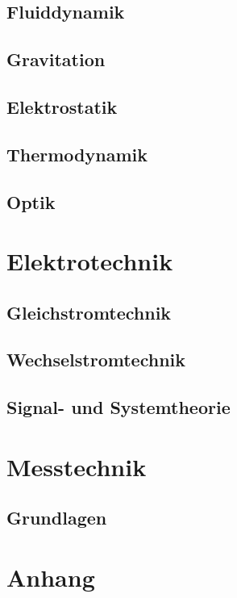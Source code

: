 \documentclass[a5paper]{report}
\begin{document}
		\chapter{Fluiddynamik}
		

		\chapter{Gravitation}
		

		\chapter{Elektrostatik}
		

		\chapter{Thermodynamik}
		

		\chapter{Optik}
		

	\part{Elektrotechnik}

		\chapter{Gleichstromtechnik}
		

		\chapter{Wechselstromtechnik}
		

		\chapter{Signal- und Systemtheorie}
		
		
	\part{Messtechnik}
	
		\chapter{Grundlagen}
		

%
%
\renewcommand{\indexname}{Sachregister}
\part{Anhang}
\printindex
\end{document}
